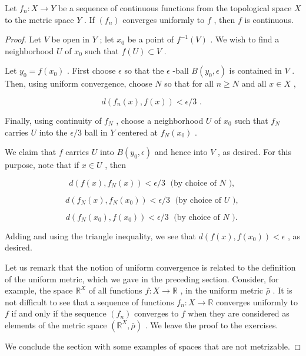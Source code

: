 \begin{theorem} Let \({f}_{n} : X \rightarrow  Y\) be a sequence of continuous functions from the topological space \(X\) to the metric space \(Y\) . If \(\left( {f}_{n}\right)\) converges uniformly to \(f\) , then \(f\) is continuous.

\end{theorem}
\begin{proof}
Let \(V\) be open in \(Y\) ; let \({x}_{0}\) be a point of \({f}^{-1}\left( V\right)\) . We wish to find a neighborhood \(U\) of \({x}_{0}\) such that \(f\left( U\right)  \subset  V\) .

Let \({y}_{0} = f\left( {x}_{0}\right)\) . First choose \(\epsilon\) so that the \(\epsilon\) -ball \(B\left( {{y}_{0},\epsilon }\right)\) is contained in \(V\) . Then, using uniform convergence, choose \(N\) so that for all \(n \geq  N\) and all \(x \in  X\) ,

\[
d\left( {{f}_{n}\left( x\right) ,f\left( x\right) }\right)  < \epsilon /3\text{ . }
\]

Finally, using continuity of \({f}_{N}\) , choose a neighborhood \(U\) of \({x}_{0}\) such that \({f}_{N}\) carries \(U\) into the \(\epsilon /3\) ball in \(Y\) centered at \({f}_{N}\left( {x}_{0}\right)\) .

We claim that \(f\) carries \(U\) into \(B\left( {{y}_{0},\epsilon }\right)\) and hence into \(V\) , as desired. For this purpose, note that if \(x \in  U\) , then

\[
d\left( {f\left( x\right) ,{f}_{N}\left( x\right) }\right)  < \epsilon /3\;\text{ (by choice of }N\text{ ), }
\]

\[
d\left( {{f}_{N}\left( x\right) ,{f}_{N}\left( {x}_{0}\right) }\right)  < \epsilon /3\;\text{ (by choice of }U\text{ ), }
\]

\[
d\left( {{f}_{N}\left( {x}_{0}\right) ,f\left( {x}_{0}\right) }\right)  < \epsilon /3\;\text{ (by choice of }N\text{ ). }
\]

Adding and using the triangle inequality, we see that \(d\left( {f\left( x\right) ,f\left( {x}_{0}\right) }\right)  < \epsilon\) , as desired.

Let us remark that the notion of uniform convergence is related to the definition of the uniform metric, which we gave in the preceding section. Consider, for example, the space \({\mathbb{R}}^{X}\) of all functions \(f : X \rightarrow  \mathbb{R}\) , in the uniform metric \(\bar{\rho }\) . It is not difficult to see that a sequence of functions \({f}_{n} : X \rightarrow  \mathbb{R}\) converges uniformly to \(f\) if and only if the sequence \(\left( {f}_{n}\right)\) converges to \(f\) when they are considered as elements of the metric space \(\left( {{\mathbb{R}}^{X},\bar{\rho }}\right)\) . We leave the proof to the exercises.

We conclude the section with some examples of spaces that are not metrizable.
\end{proof}

